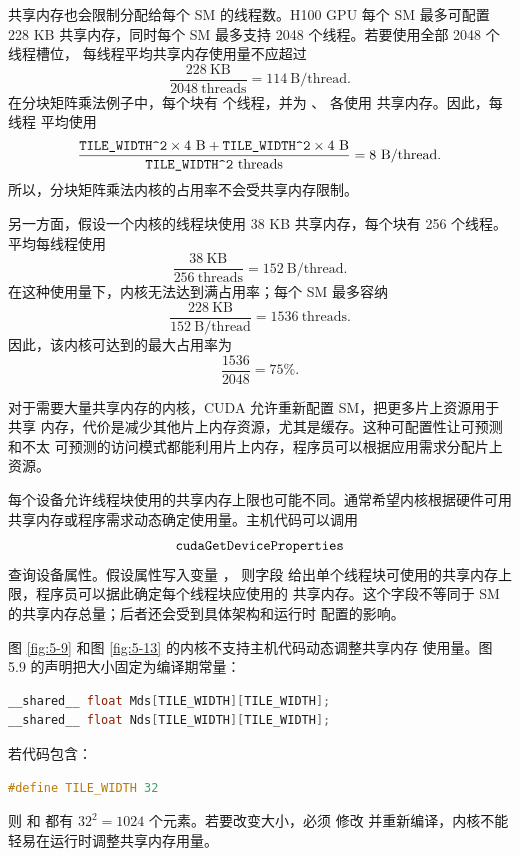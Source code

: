 共享内存也会限制分配给每个 SM 的线程数。H100 GPU 每个 SM 最多可配置 228 KB
共享内存，同时每个 SM 最多支持 2048 个线程。若要使用全部 2048 个线程槽位，
每线程平均共享内存使用量不应超过
\[
  \frac{228\ \mathrm{KB}}{2048\ \mathrm{threads}}
  =114\ \mathrm{B/thread}.
\]
在分块矩阵乘法例子中，每个块有  个线程，并为
、 各使用  共享内存。因此，每线程
平均使用
\[
  \frac{\code{TILE_WIDTH^2}\times4\ \mathrm{B}
       +\code{TILE_WIDTH^2}\times4\ \mathrm{B}}
       {\code{TILE_WIDTH^2}\ \mathrm{threads}}
  =8\ \mathrm{B/thread}.
\]
所以，分块矩阵乘法内核的占用率不会受共享内存限制。

另一方面，假设一个内核的线程块使用 38 KB 共享内存，每个块有 256 个线程。
平均每线程使用
\[
  \frac{38\ \mathrm{KB}}{256\ \mathrm{threads}}
  =152\ \mathrm{B/thread}.
\]
在这种使用量下，内核无法达到满占用率；每个 SM 最多容纳
\[
  \frac{228\ \mathrm{KB}}{152\ \mathrm{B/thread}}
  =1536\ \mathrm{threads}.
\]
因此，该内核可达到的最大占用率为
\[
  \frac{1536}{2048}=75\%.
\]

对于需要大量共享内存的内核，CUDA 允许重新配置 SM，把更多片上资源用于共享
内存，代价是减少其他片上内存资源，尤其是缓存。这种可配置性让可预测和不太
可预测的访问模式都能利用片上内存，程序员可以根据应用需求分配片上资源。

每个设备允许线程块使用的共享内存上限也可能不同。通常希望内核根据硬件可用
共享内存或程序需求动态确定使用量。主机代码可以调用
\[
\code{cudaGetDeviceProperties}
\]
查询设备属性。假设属性写入变量 ，
则字段
给出单个线程块可使用的共享内存上限，程序员可以据此确定每个线程块应使用的
共享内存。这个字段不等同于 SM 的共享内存总量；后者还会受到具体架构和运行时
配置的影响。

图 \ref{fig:5-9} 和图 \ref{fig:5-13} 的内核不支持主机代码动态调整共享内存
使用量。图 5.9 的声明把大小固定为编译期常量：

\begin{lstlisting}[language=C++]
__shared__ float Mds[TILE_WIDTH][TILE_WIDTH];
__shared__ float Nds[TILE_WIDTH][TILE_WIDTH];
\end{lstlisting}

若代码包含：

\begin{lstlisting}[language=C++]
#define TILE_WIDTH 32
\end{lstlisting}

则  和  都有 $32^2=1024$ 个元素。若要改变大小，必须
修改  并重新编译，内核不能轻易在运行时调整共享内存用量。

